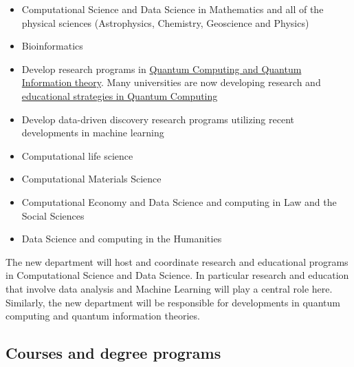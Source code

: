\documentclass[%
oneside,                 %
final,                   %
10pt]{article}
\begin{document}
\begin{itemize}
\item Computational Science and Data Science in Mathematics and all of the physical sciences (Astrophysics, Chemistry, Geoscience and Physics)

\item Bioinformatics

\item Develop research programs in \href{{https://www.aps.org/publications/apsnews/201802/ostp.cfm?utm_source=APS+Physics+Main+Group&utm_campaign=fb7a2e7d6b-News+021218&utm_medium=email&utm_term=0_825303224b-fb7a2e7d6b-106513221}}{Quantum Computing and Quantum Information theory}. Many universities are now developing research and \href{{https://vprgs.msu.edu/event/interdisciplinary-forum-quantum-information-science}}{educational strategies in Quantum Computing}

\item Develop data-driven discovery research programs utilizing recent developments in machine learning

\item Computational life science

\item Computational Materials Science

\item Computational Economy and Data Science and computing in Law and the Social Sciences

\item Data Science and computing in the Humanities
\end{itemize}

\noindent
The new department will host and coordinate research and educational programs in Computational Science and Data Science. In particular research and education that involve  data analysis and Machine Learning will play a central role here. Similarly, the new department will be responsible for developments in quantum computing and quantum information theories. 

\subsection*{Courses and degree programs}
\end{document}
